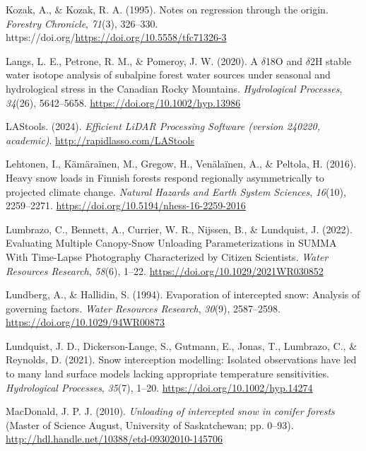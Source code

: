 \documentclass[
  letterpaper,
  DIV=11,
  numbers=noendperiod]{scrartcl}
\newlength{\cslhangindent}
\newenvironment{CSLReferences}[2] %
 {\begin{list}{}{%
  \setlength{\itemindent}{0pt}
  \setlength{\leftmargin}{0pt}
  \setlength{\parsep}{0pt}
  \ifodd #1
   \setlength{\leftmargin}{\cslhangindent}
   \setlength{\itemindent}{-1\cslhangindent}
  \fi
  \setlength{\itemsep}{#2\baselineskip}}}
 {\end{list}}
\begin{document}
\begin{CSLReferences}{1}{0}
Kozak, A., \& Kozak, R. A. (1995). {Notes on regression through the
origin}. \emph{Forestry Chronicle}, \emph{71}(3), 326--330.
https://doi.org/\url{https://doi.org/10.5558/tfc71326-3}

Langs, L. E., Petrone, R. M., \& Pomeroy, J. W. (2020). {A \(\delta\)18O
and \(\delta\)2H stable water isotope analysis of subalpine forest water
sources under seasonal and hydrological stress in the Canadian Rocky
Mountains}. \emph{Hydrological Processes}, \emph{34}(26), 5642--5658.
\url{https://doi.org/10.1002/hyp.13986}

LAStools. (2024). \emph{{Efficient LiDAR Processing Software (version
240220, academic)}}. \url{http://rapidlasso.com/LAStools}

Lehtonen, I., Kämäraïnen, M., Gregow, H., Venälaïnen, A., \& Peltola, H.
(2016). {Heavy snow loads in Finnish forests respond regionally
asymmetrically to projected climate change}. \emph{Natural Hazards and
Earth System Sciences}, \emph{16}(10), 2259--2271.
\url{https://doi.org/10.5194/nhess-16-2259-2016}

Lumbrazo, C., Bennett, A., Currier, W. R., Nijssen, B., \& Lundquist, J.
(2022). {Evaluating Multiple Canopy-Snow Unloading Parameterizations in
SUMMA With Time-Lapse Photography Characterized by Citizen Scientists}.
\emph{Water Resources Research}, \emph{58}(6), 1--22.
\url{https://doi.org/10.1029/2021WR030852}

Lundberg, A., \& Hallidin, S. (1994). {Evaporation of intercepted snow:
Analysis of governing factors}. \emph{Water Resources Research},
\emph{30}(9), 2587--2598. \url{https://doi.org/10.1029/94WR00873}

Lundquist, J. D., Dickerson-Lange, S., Gutmann, E., Jonas, T., Lumbrazo,
C., \& Reynolds, D. (2021). {Snow interception modelling: Isolated
observations have led to many land surface models lacking appropriate
temperature sensitivities}. \emph{Hydrological Processes}, \emph{35}(7),
1--20. \url{https://doi.org/10.1002/hyp.14274}

MacDonald, J. P. J. (2010). \emph{{Unloading of intercepted snow in
conifer forests}} (Master of Science August, University of Saskatchewan;
pp. 0--93). \url{http://hdl.handle.net/10388/etd-09302010-145706}


\end{CSLReferences}
\end{document}
